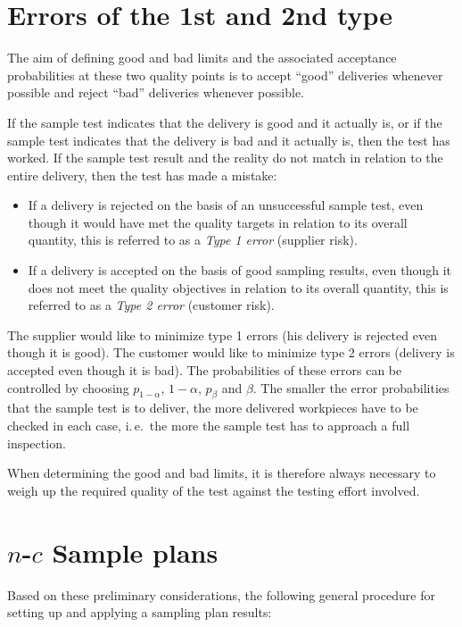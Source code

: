 \documentclass[a4paper,11pt,oneside]{article}
\begin{document}
\section{Errors of the 1st and 2nd type}

The aim of defining good and bad limits and the associated acceptance probabilities at these two quality points is to accept ``good'' deliveries whenever possible and reject ``bad'' deliveries whenever possible.

If the sample test indicates that the delivery is good and it actually is, or if the sample test indicates that the delivery is bad and it actually is, then the test has worked. If the sample test result and the reality do not match in relation to the entire delivery, then the test has made a mistake:

\begin{itemize}
\item
If a delivery is rejected on the basis of an unsuccessful sample test, even though it would have met the quality targets in relation to its overall quantity, this is referred to as a \emph{Type 1 error} (supplier risk).
\item
If a delivery is accepted on the basis of good sampling results, even though it does not meet the quality objectives in relation to its overall quantity, this is referred to as a \emph{Type 2 error} (customer risk).
\end{itemize}

The supplier would like to minimize type 1 errors (his delivery is rejected even though it is good). The customer would like to minimize type 2 errors (delivery is accepted even though it is bad). The probabilities of these errors can be controlled by choosing $p_{1-\alpha}$, $1-\alpha$, $p_\beta$ and $\beta$. The smaller the error probabilities that the sample test is to deliver, the more delivered workpieces have to be checked in each case, i.\,e.\ the more the sample test has to approach a full inspection.

When determining the good and bad limits, it is therefore always necessary to weigh up the required quality of the test against the testing effort involved.



\section[n-c Sample plans]{$n$-$c$ Sample plans}

Based on these preliminary considerations, the following general procedure for setting up and applying a sampling plan results:
\end{document}
